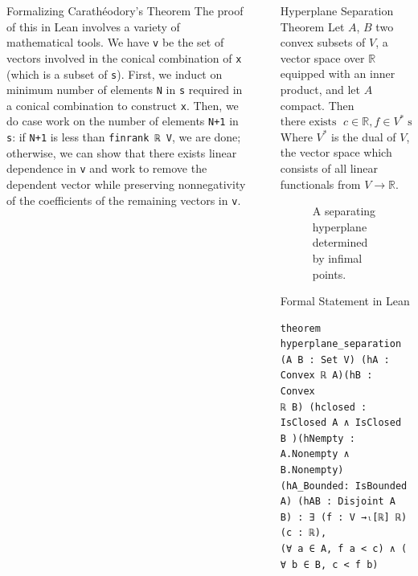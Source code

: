 \documentclass[final]{beamer}
\newlength{\sepwidth}
\newlength{\colwidth}
\newcommand{\separatorcolumn}{\begin{column}{\sepwidth}\end{column}}
\begin{document}
\begin{frame}[fragile]
\begin{columns}[t]
\begin{column}{\colwidth}
\begin{block}{Formalizing Carath\'eodory's Theorem}
              The proof of this in Lean involves a variety of mathematical tools. We have \verb|v| be the set of vectors involved in the conical combination of \verb|x| (which is a subset of \verb|s|). First, we induct on minimum number of elements \verb|N| in \verb|s| required in a conical combination to construct \verb|x|. Then, we do case work on the number of elements \verb|N+1| in \verb|s|: if \verb|N+1| is less than \verb|finrank ℝ V|, we are done; otherwise, we can show that there exists linear dependence in \verb|v| and work to remove the dependent vector while preserving nonnegativity of the coefficients of the remaining vectors in \verb|v|.  
            \end{block}    
            
            

        \end{column}

        \separatorcolumn

        \begin{column}{\colwidth}

            
            \begin{alertblock}{Hyperplane Separation Theorem}
                Let $A$, $B$ two convex subsets of $V$, a vector space over $\mathbb{R}$ equipped with an inner product, and let $A$ compact. Then $
                    \text{there exists } \; c\in \mathbb{R}, f \in V^* \; \text{such that} \; f(a) < c \; \text{for all}\; a\in A, \ c < f(b)\; \text{for all}\; b\in B
                  $ Where $V^*$ is the dual of $V$, the vector space which consists of all linear functionals from $V\to \mathbb{R}$.
            \end{alertblock}

            \begin{figure}[htbp]
                \centering
                
                \caption{A separating hyperplane determined by infimal points. \label{fig:hyperplane-separation}}
            \end{figure}

\begin{block}{Formal Statement in Lean}
\vspace{-0.5em}
\begin{Verbatim}
theorem hyperplane_separation  (A B : Set V) (hA : Convex ℝ A)(hB : Convex 
ℝ B) (hclosed : IsClosed A ∧ IsClosed B )(hNempty : A.Nonempty ∧ B.Nonempty) 
(hA_Bounded: IsBounded A) (hAB : Disjoint A B) : ∃ (f : V →ₗ[ℝ] ℝ) (c : ℝ),
(∀ a ∈ A, f a < c) ∧ (  ∀ b ∈ B, c < f b)
\end{Verbatim}
\end{block}


\end{column}
\end{columns}
\end{frame}
\end{document}
